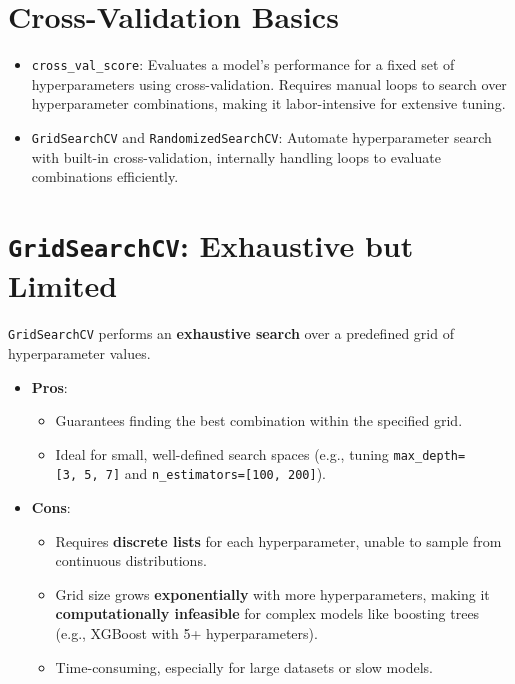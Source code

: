 \documentclass[
  letterpaper,
  DIV=11,
  numbers=noendperiod]{scrreprt}
\providecommand{\tightlist}{%
  \setlength{\itemsep}{0pt}\setlength{\parskip}{0pt}}\usepackage{longtable,booktabs,array}
\begin{document}
\section{Cross-Validation Basics}\label{cross-validation-basics}

\begin{itemize}
\item
  \texttt{cross\_val\_score}: Evaluates a model's performance for a
  fixed set of hyperparameters using cross-validation. Requires manual
  loops to search over hyperparameter combinations, making it
  labor-intensive for extensive tuning.
\item
  \texttt{GridSearchCV} and \texttt{RandomizedSearchCV}: Automate
  hyperparameter search with built-in cross-validation, internally
  handling loops to evaluate combinations efficiently.
\end{itemize}

\section{\texorpdfstring{\texttt{GridSearchCV}: Exhaustive but
Limited}{GridSearchCV: Exhaustive but Limited}}\label{gridsearchcv-exhaustive-but-limited}

\texttt{GridSearchCV} performs an \textbf{exhaustive search} over a
predefined grid of hyperparameter values.

\begin{itemize}
\tightlist
\item
  \textbf{Pros}:

  \begin{itemize}
  \tightlist
  \item
    Guarantees finding the best combination within the specified grid.
  \item
    Ideal for small, well-defined search spaces (e.g., tuning
    \texttt{max\_depth={[}3,\ 5,\ 7{]}} and
    \texttt{n\_estimators={[}100,\ 200{]}}).
  \end{itemize}
\item
  \textbf{Cons}:

  \begin{itemize}
  \tightlist
  \item
    Requires \textbf{discrete lists} for each hyperparameter, unable to
    sample from continuous distributions.
  \item
    Grid size grows \textbf{exponentially} with more hyperparameters,
    making it \textbf{computationally infeasible} for complex models
    like boosting trees (e.g., XGBoost with 5+ hyperparameters).
  \item
    Time-consuming, especially for large datasets or slow models.
  \end{itemize}
\end{itemize}
\end{document}
